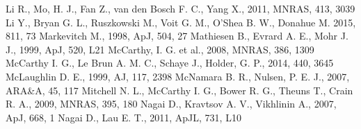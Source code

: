 \documentclass[a4paper,fleqn,usenatbib]{mnras}
\begin{document}
{\begin{thebibliography}{}
Li R., Mo, H. J., Fan Z., van den Bosch F. C., Yang X., 2011, MNRAS, 413, 3039
Li Y., Bryan G. L., Ruszkowski M., Voit G. M., O'Shea B. W., Donahue M. 2015, 811, 73
Markevitch M., 1998, ApJ, 504, 27 
Mathiesen B., Evrard A. E.,  Mohr J. J., 1999, ApJ, 520, L21
McCarthy, I. G. et al., 2008, MNRAS, 386, 1309
McCarthy I. G., Le Brun A. M. C., Schaye J., Holder, G. P., 2014, 440, 3645
McLaughlin D. E., 1999, AJ, 117, 2398
McNamara B. R., Nulsen, P. E. J., 2007, ARA\&A, 45, 117
Mitchell N. L., McCarthy I. G., Bower R. G., Theuns T., Crain R. A., 2009, MNRAS, 395, 180
Nagai D., Kravtsov A. V., Vikhlinin A., 2007, ApJ, 668, 1 
Nagai D., Lau E. T., 2011, ApJL, 731, L10

\end{thebibliography}}
\end{document}
